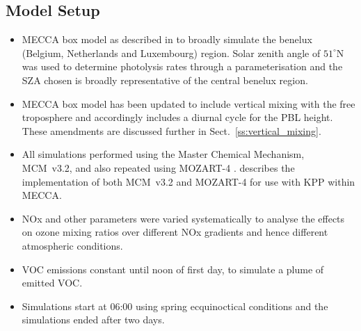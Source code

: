 \subsection{Model Setup} \label{ss:model_setup}
\begin{itemize}
    \item MECCA box model as described in \citet{Coates:2015} to broadly simulate the benelux (Belgium, Netherlands and Luxembourg) region. Solar zenith angle of $51^{\circ}$N was used to determine photolysis rates through a parameterisation and the SZA chosen is broadly representative of the central benelux region.
    \item MECCA box model has been updated to include vertical mixing with the free troposphere and accordingly includes a diurnal cycle for the PBL height. These amendments are discussed further in Sect.~\ref{ss:vertical_mixing}.
    \item All simulations performed using the Master Chemical Mechanism, MCM~v3.2, \citep{MCM_Site} and also repeated using MOZART-4 \citep{Emmons:2010}. \citet{Coates:2015} describes the implementation of both MCM~v3.2 and MOZART-4 for use with KPP within MECCA.
    \item NOx and other parameters were varied systematically to analyse the effects on ozone mixing ratios over different NOx gradients and hence different atmospheric conditions.
    \item VOC emissions constant until noon of first day, to simulate a plume of emitted VOC.
    \item Simulations start at 06:00 using spring ecquinoctical conditions and the simulations ended after two days.
\end{itemize}

